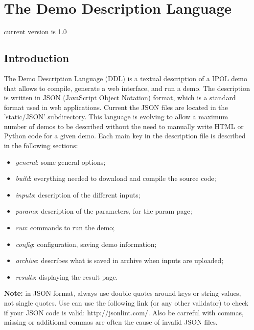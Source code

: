 \section{The Demo Description Language}

current version is 1.0

\subsection{Introduction}
The Demo Description Language (DDL) is a textual description of a IPOL demo that 
allows to compile, generate a web interface, and run a demo. The description is 
written in JSON (JavaScript Object Notation) format, which is a standard format 
used in web applications. Current the JSON files are located in the 'static/JSON'
subdirectory. This language is evolving to allow a maximum number 
of demos to be described without the need to manually write HTML or Python code 
for a given demo. Each main key in the description file is described in the 
following sections:
\begin{itemize}
  \item \textit{general}: some general options;
  \item \textit{build}: everything needed to download and compile the source code;
  \item \textit{inputs}: description of the different inputs;
  \item \textit{params}: description of the parameters, for the param page;
  \item \textit{run}: commands to run the demo;
  \item \textit{config}: configuration, saving demo information;
  \item \textit{archive}: describes what is saved in archive when inputs are uploaded;
  \item \textit{results}: displaying the result page.
\end{itemize}



{\bf Note:} in JSON format, always use double quotes around keys or string 
values, not single quotes. Use can use the following link (or any other validator)
to check if your JSON code is valid: http://jsonlint.com/.
Also be carreful with commas, missing or additional commas are often the cause of
invalid JSON files.

